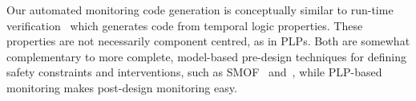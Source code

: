 \documentclass[ 5p, 12pt, times, twocolumn, sort&compress ]{elsarticle}
\begin{document}
Our automated monitoring code generation is conceptually similar to
run-time verification~\cite{runtimeveri} which generates code from temporal logic properties.
These properties are not necessarily component centred, as in PLPs. Both are somewhat complementary to more complete, model-based
pre-design techniques for defining safety constraints and interventions, such as SMOF~\cite{SMOF} and~\cite{Woodman12}, while
PLP-based monitoring makes post-design monitoring easy.
\end{document}
